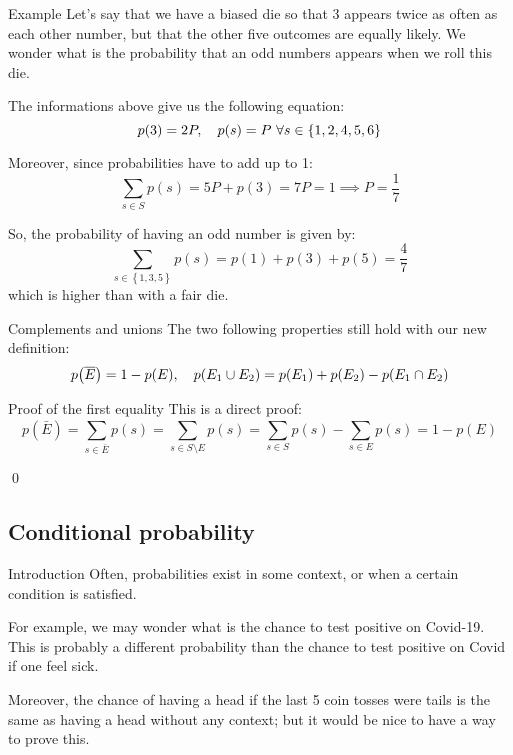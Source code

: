 \documentclass[a4paper]{article}
\begin{document}
\begin{parag}{Example}
    Let's say that we have a biased die so that $3$ appears twice as often as each other number, but that the other five outcomes are equally likely. We wonder what is the probability that an odd numbers appears when we roll this die.

    The informations above give us the following equation: 
    \[p\left(3\right) = 2P, \mathspace p\left(s\right) = P\ \forall s \in \left\{1,2,4,5,6\right\}\]
    
    Moreover, since probabilities have to add up to 1: 
    \[\sum_{s \in S}^{} p\left(s\right) = 5P + p\left(3\right) = 7P = 1 \implies P = \frac{1}{7}\]
    
    So, the probability of having an odd number is given by: 
    \[\sum_{s \in \left\{1, 3, 5\right\}}^{} p\left(s\right) = p\left(1\right) + p\left(3\right) + p\left(5\right) = \frac{4}{7}\]
    which is higher than with a fair die.
\end{parag}

\begin{parag}{Complements and unions}
    The two following properties still hold with our new definition:
    \[p\left(\bar{E}\right) = 1 - p\left(E\right), \mathspace p\left(E_1 \cup E_2\right) = p\left(E_1\right) + p\left(E_2\right) - p\left(E_1 \cap E_2\right)\]

    \begin{subparag}{Proof of the first equality}
        This is a direct proof: 
        \[p\left(\bar{E}\right) = \sum_{s \in \bar{E}}^{} p\left(s\right) = \sum_{s \in S \setminus E}^{} p\left(s\right) = \sum_{s \in S}^{} p\left(s\right) - \sum_{s \in E}^{} p\left(s\right) = 1 - p\left(E\right) \]

        \qed
    \end{subparag}
\end{parag}

\subsection{Conditional probability}
\begin{parag}{Introduction}
    Often, probabilities exist in some context, or when a certain condition is satisfied. 

    For example, we may wonder what is the chance to test positive on Covid-19. This is probably a different probability than the chance to test positive on Covid if one feel sick.

    Moreover, the chance of having a head if the last 5 coin tosses were tails is the same as having a head without any context; but it would be nice to have a way to prove this.
\end{parag}
\end{document}
